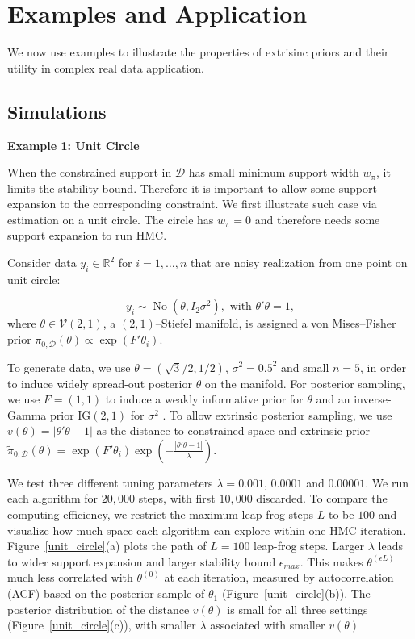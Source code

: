 \documentclass[10pt]{article}
\newcommand{\mc}[1]{\mathcal{#1}}
\DeclareMathOperator{\No}{No}
\DeclareMathOperator{\1}{\mathbbm{1}}
\begin{document}
\section{Examples and Application}

We now use examples to illustrate the properties of extrisinc priors and their utility in complex real data application.

\subsection{Simulations}

{\bf Example 1: Unit Circle}

When the constrained support in $\mc D$ has small minimum support width $w_\pi$, it limits the stability bound. Therefore it is important to allow some support expansion to the corresponding constraint. We first illustrate such case via estimation on a unit circle. The circle has $w_\pi =0$ and therefore needs some support expansion to run HMC. 


Consider data $y_i\in \mathbb{R}^2$ for $i=1,\ldots,n$  that are noisy realization from one point on unit circle:

$$y_i\sim \No(\theta, I_2\sigma^2),\text{ with } \theta'\theta=1,$$
where $\theta \in \mc V(2,1)$, a $(2,1)$--Stiefel manifold, is assigned a von Mises--Fisher prior $\pi_{0,\mc D}(\theta) \propto \exp(F'\theta_i)$.

 To generate data, we use $\theta= (\sqrt 3/2, 1/2)$, $\sigma^2=0.5^2$ and small $n=5$, in order to induce widely spread-out posterior $\theta$ on the manifold. For posterior sampling, we use $F=(1,1)$ to induce a weakly informative prior for $\theta$ and an inverse-Gamma prior $\text{IG}(2,1)$ for $\sigma^2$ . To allow extrinsic posterior sampling, we use $v(\theta)=|\theta'\theta -1|$ as the distance to constrained space and extrinsic prior $\tilde\pi_{0,\mc D}(\theta)= \exp(F'\theta_i) \exp(-\frac{|\theta'\theta -1|}{\lambda})$.

We test three different tuning parameters  $\lambda = 0.001$, $0.0001$ and $0.00001$. We run each algorithm for $20,000$ steps, with first $10,000$ discarded. To compare the computing efficiency, we restrict the maximum leap-frog steps $L$ to be $100$ and visualize how much space each algorithm can explore within one HMC iteration. Figure~\ref{unit_circle}(a) plots the path of $L=100$ leap-frog steps. Larger $\lambda$ leads to wider support expansion and larger stability bound $\epsilon_{max}$. This makes $\theta^{(\epsilon L)}$  much less correlated with $\theta^{(0)}$ at each iteration, measured by autocorrelation (ACF) based on the posterior sample of $\theta_1$ (Figure~\ref{unit_circle}(b)). The posterior distribution of the distance $v(\theta)$ is small for all three settings (Figure~\ref{unit_circle}(c)), with smaller $\lambda$ associated with smaller $v(\theta)$
\end{document}
